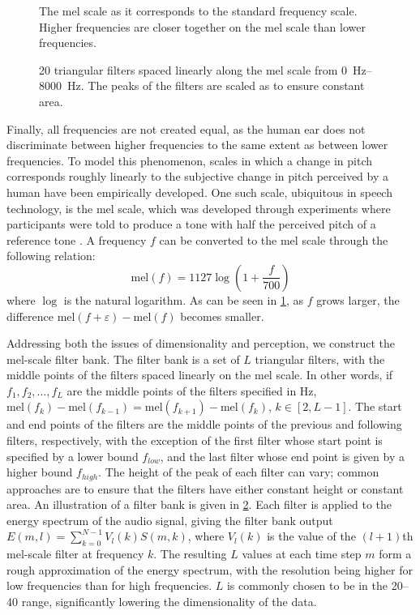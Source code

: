 \begin{figure}
  \centering
  
  \caption{\label{fig:melscale}The mel scale as it corresponds to the standard frequency scale.
  Higher frequencies are closer together on the mel scale than lower frequencies.}
\end{figure}

\begin{figure}
  \centering
  
  \caption{\label{fig:filterbank}20 triangular filters spaced linearly along the mel scale from \SIrange{0}{8000}{\Hz}.
  The peaks of the filters are scaled as to ensure constant area.}
\end{figure}

Finally, all frequencies are not created equal, as the human ear does not discriminate between higher frequencies to the same extent as between lower frequencies.
To model this phenomenon, scales in which a change in pitch corresponds roughly linearly to the subjective change in pitch perceived by a human have been empirically developed.
One such scale, ubiquitous in speech technology, is the mel scale, which was developed through experiments where participants were told to produce a tone with half the perceived pitch of a reference tone \parencite{stevens1937scale}.
A frequency $f$ can be converted to the mel scale through the following relation:
\begin{equation}
  \mathrm{mel}(f) = 1127\log\left(1 + \frac{f}{700}\right)
\end{equation}
where $\log$ is the natural logarithm.
As can be seen in \cref{fig:melscale}, as $f$ grows larger, the difference $\mathrm{mel}(f+\varepsilon) - \mathrm{mel}(f)$ becomes smaller.

Addressing both the issues of dimensionality and perception, we construct the mel-scale filter bank.
The filter bank is a set of $L$ triangular filters, with the middle points of the filters spaced linearly on the mel scale.
In other words, if $f_1, f_2, \dots, f_L$ are the middle points of the filters specified in \si{\Hz}, $\mathrm{mel}(f_k) - \mathrm{mel}(f_{k-1}) = \mathrm{mel}(f_{k+1}) - \mathrm{mel}(f_k)$, $k \in [2, L-1]$.
The start and end points of the filters are the middle points of the previous and following filters, respectively, with the exception of the first filter whose start point is specified by a lower bound $f_{low}$, and the last filter whose end point is given by a higher bound $f_{high}$.
The height of the peak of each filter can vary; common approaches are to ensure that the filters have either constant height or constant area.
An illustration of a filter bank is given in \cref{fig:filterbank}.
Each filter is applied to the energy spectrum of the audio signal, giving the filter bank output $E(m,l) = \sum_{k=0}^{N-1}V_l(k)S(m,k)$, where $V_l(k)$ is the value of the $(l+1)$th mel-scale filter at frequency $k$.
The resulting $L$ values at each time step $m$ form a rough approximation of the energy spectrum, with the resolution being higher for low frequencies than for high frequencies.
$L$ is commonly chosen to be in the \numrange{20}{40} range, significantly lowering the dimensionality of the data.

